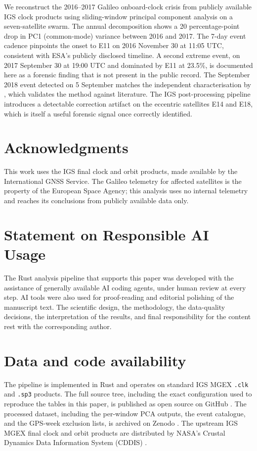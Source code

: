 \documentclass[11pt,a4paper]{article}
\begin{document}
We reconstruct the 2016--2017 Galileo onboard-clock crisis from publicly available IGS clock products using sliding-window principal component analysis on a seven-satellite swarm. The annual decomposition shows a 20 percentage-point drop in PC1 (common-mode) variance between 2016 and 2017. The 7-day event cadence pinpoints the onset to E11 on 2016 November 30 at 11:05 UTC, consistent with ESA's publicly disclosed timeline. A second extreme event, on 2017 September 30 at 19:00 UTC and dominated by E11 at 23.5\%, is documented here as a forensic finding that is not present in the public record. The September 2018 event detected on 5 September matches the independent characterisation by \citet{Galluzzo2021}, which validates the method against literature. The IGS post-processing pipeline introduces a detectable correction artifact on the eccentric satellites E14 and E18, which is itself a useful forensic signal once correctly identified.

\section*{Acknowledgments}

This work uses the IGS final clock and orbit products, made available by the International GNSS Service. The Galileo telemetry for affected satellites is the property of the European Space Agency; this analysis uses no internal telemetry and reaches its conclusions from publicly available data only.

\section*{Statement on Responsible AI Usage}

The Rust analysis pipeline that supports this paper was developed with the assistance of generally available AI coding agents, under human review at every step. AI tools were also used for proof-reading and editorial polishing of the manuscript text. The scientific design, the methodology, the data-quality decisions, the interpretation of the results, and final responsibility for the content rest with the corresponding author.

\section*{Data and code availability}

The pipeline is implemented in Rust and operates on standard IGS MGEX \texttt{.clk} and \texttt{.sp3} products. The full source tree, including the exact configuration used to reproduce the tables in this paper, is published as open source on GitHub \citep{HansenCode2026}. The processed dataset, including the per-window PCA outputs, the event catalogue, and the GPS-week exclusion lists, is archived on Zenodo \citep{HansenData2026}. The upstream IGS MGEX final clock and orbit products are distributed by NASA's Crustal Dynamics Data Information System (CDDIS) \citep{CDDIS_MGEX, Noll2010}.
\end{document}
